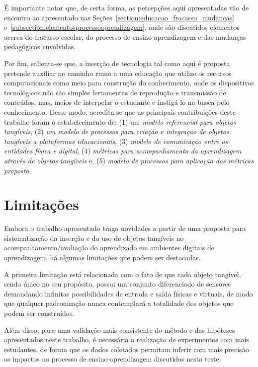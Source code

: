 É importante notar que, de certa forma, as percepções aqui apresentadas vão de encontro ao apresentado nas Seções~\ref{section:educacao_fracasso_mudancas} e~\ref{subsection:elementosprocessoaprendizagem}, onde são discutidos elementos acerca do fracasso escolar, do processo de ensino-aprendizagem e das mudanças pedagógicas envolvidas.

Por fim, salienta-se que,
a inserção de tecnologia tal como aqui é proposta pretende auxiliar no caminho rumo a uma educação que utilize os recursos computacionais como meio para construção do conhecimento,%
 onde os dispositivos tecnológicos não são simples ferramentas de reprodução e transmissão de conteúdos, mas, meios de interpelar o estudante e instigá-lo na busca pelo conhecimento. Desse modo, acredita-se que as principais contribuições deste trabalho foram o estabelecimento de: (1) um \textit{modelo referencial para objetos tangíveis}, (2) \textit{um modelo de processos para criação e integração de objetos tangíveis a plataformas educacionais}, (3) \textit{modelo de comunicação entre as entidades física e digital}, (4) \textit{métricas para acompanhamento da aprendizagem através de objetos tangíveis} e, (5) \textit{modelo de processos para aplicação das métricas proposta}.

\section{Limitações}

Embora o trabalho apresentado traga novidades a partir de uma proposta para sistematização da inserção e do uso de objetos tangíveis no acompanhamento/avaliação do aprendizado em ambientes digitais de aprendizagem, há algumas limitações que podem ser destacadas.

A primeira limitação está relacionada com o fato de que cada objeto tangível, sendo único no seu propósito, possui um conjunto diferenciado de sensores demandando infinitas possibilidades de entrada e saída físicas e virtuais, de modo que qualquer padronização nunca contemplará a totalidade dos objetos que podem ser construídos.

Além disso, para uma validação mais consistente do método e das hipóteses apresentados neste trabalho, é necessária a realização de experimentos com mais estudantes, de forma que os dados coletados permitam inferir com mais precisão os impactos no processo de ensino-aprendizagem discutidos nesta teste.

